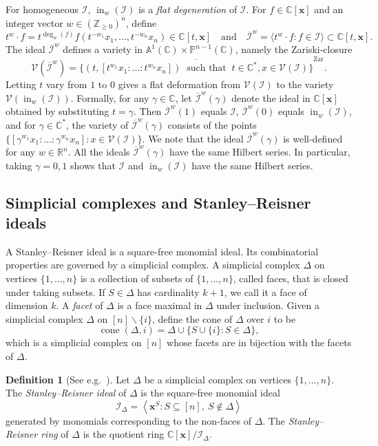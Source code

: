 \documentclass[10pt]{amsart}
\theoremstyle{definition}
\newtheorem{defi}[theo]{Definition}
\providecommand{\eg}{e.g.\ }
\newcommand{\PP}{\mathbb{P}}
\newcommand{\Z}{\mathbb{Z}}
\newcommand{\R}{\mathbb{R}}
\newcommand{\Cbb}{\mathbb{C}}
\newcommand{\V}{\mathcal{V}}
\newcommand{\I}{\mathcal{I}}
\newcommand{\x}{\mathbf{x}}
\newcommand{\ol}{\overline}
\DeclareMathOperator{\In}{in}
\DeclareMathOperator{\Zar}{Zar}
\DeclareMathOperator{\cone}{cone}
\begin{document}
For homogeneous $\I$, $\In_w(\I)$ is a \emph{flat degeneration} of $\I$. 
For $f\in \Cbb[\x]$ and an integer vector $w\in (\Z_{\geq 0})^n$, define 
\[t^w\cdot f = t^{\deg_w(f)}f(t^{-w_1}x_1, \ldots , t^{-w_n}x_n) \in \Cbb[t,\x]
\quad \text{and} \quad
\ol{\I}^w = \langle t^{w}\cdot f : f\in \I \rangle \subset \Cbb[t,\x].
\]
The ideal $\ol{\I}^w$ defines a variety in $\mathbb{A}^1(\Cbb) \times \PP^{n-1}(\Cbb)$,
namely the Zariski-closure 
\[
\V(\ol{\I}^w) = \ol{\bigl\{ (t, [t^{w_1} x_1 : \ldots : t^{w_n}x_n ]) \ \text{ such that } \ t\in {\Cbb^*}, x\in \V(\I)\bigl\}}^{\Zar}.
\]
Letting $t$ vary from $1$ to $0$ gives a flat deformation from $\V(\I)$ to 
the variety $\V(\In_w(\I))$. Formally, for any $\gamma\in \Cbb$, let $\ol{\I}^w(\gamma)$ denote the ideal in $\Cbb[\x]$
obtained by substituting $t = \gamma$. 
Then $\ol{\I}^w(1)$ equals $ \I$, $\ol{\I}^w(0)$ equals $\In_w(\I)$, 
and for $\gamma\in \Cbb^*$, the variety of $\ol{\I}^w(\gamma)$ 
consists of the points $\{[\gamma^{w_1} x_1 : \ldots : \gamma^{w_n}x_n] : x\in \V(\I)\}$. 
We note that the ideal $\ol{\I}^w(\gamma)$ is well-defined for any $w\in \R^n$. 
All the ideals $\ol{\I}^w(\gamma)$ have the same Hilbert series. 
In particular, taking $\gamma = 0,1$ shows that $\I$ and $\In_w(\I)$ have the same Hilbert series. 


\subsection{Simplicial complexes and Stanley--Reisner ideals} \label{subsec:SRI}
A Stanley--Reisner ideal is a square-free monomial ideal. Its combinatorial 
properties are governed by a simplicial complex. 
A simplicial complex $\Delta$ on vertices $\{1,\ldots ,n\}$ is a collection of subsets of 
$\{1,\ldots , n\}$, called faces, that is closed under taking subsets. If $S \in \Delta$ has 
cardinality $k+1$, we call it a face of dimension $k$. A \emph{facet} of $\Delta$ is a face maximal in $\Delta$ under inclusion. 
Given a simplicial complex $\Delta$ on $[n]\backslash \{i\}$, define the cone of $\Delta$ over $i$ to be 
\[ 
\cone (\Delta, i) = \Delta \cup \{ S\cup \{i\} : S \in \Delta\}, \]
which is a simplicial complex on $[n]$ whose facets are in bijection with the facets of $\Delta$. 

\begin{defi}[See \eg {\cite[Chapter~II]{StanleyCCABook}}]Let $\Delta$ be a simplicial complex on vertices $\{1,\ldots , n\}$. The \emph{Stanley--Reisner ideal} of $\Delta$ is the square-free monomial ideal 
\[
\I_{\Delta} = \left\langle \x^S \colon S\subseteq [n], \ S\not\in \Delta \right\rangle
\]
generated by monomials corresponding to the non-faces of $\Delta$. The \emph{Stanley--Reisner ring} of $\Delta$ is the quotient ring $\Cbb[\x]/\I_{\Delta}$. 
\end{defi}
\end{document}
